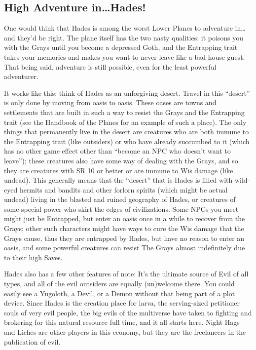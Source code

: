 \subsection{High Adventure in\ldots Hades!}

One would think that Hades is among the worst Lower Planes to adventure in\ldots and they'd be right. The plane itself has the two nasty qualities: it poisons you with the Grays until you become a depressed Goth, and the Entrapping trait takes your memories and makes you want to never leave like a bad house guest. That being said, adventure is still possible, even for the least powerful adventurer.

It works like this: think of Hades as an unforgiving desert. Travel in this ``desert'' is only done by moving from oasis to oasis. These oases are towns and settlements that are built in such a way to resist the Grays and the Entrapping trait (see the Handbook of the Planes for an example of such a place). The only things that permanently live in the desert are creatures who are both immune to the Entrapping trait (like outsiders) or who have already succumbed to it (which has no other game effect other than ``become an NPC who doesn't want to leave''); these creatures also have some way of dealing with the Grays, and so they are creatures with SR 10 or better or are immune to Wis damage (like undead). This generally means that the ``desert'' that is Hades is filled with wild-eyed hermits and bandits and other forlorn spirits (which might be actual undead) living in the blasted and ruined geography of Hades, or creatures of some special power who skirt the edges of civilizations. Some NPCs you meet might just be Entrapped, but enter an oasis once in a while to recover from the Grays; other such characters might have ways to cure the Wis damage that the Grays cause, thus they are entrapped by Hades, but have no reason to enter an oasis, and some powerful creatures can resist The Grays almost indefinitely due to their high Saves.

Hades also has a few other features of note: It's the ultimate source of Evil of all types, and all of the evil outsiders are equally (un)welcome there. You could easily see a Yugoloth, a Devil, or a Demon without that being part of a plot device. Since Hades is the creation place for larva, the serving-sized petitioner souls of very evil people, the big evils of the multiverse have taken to fighting and brokering for this natural resource full time, and it all starts here. Night Hags and Liches are other players in this economy, but they are the freelancers in the publication of evil.

